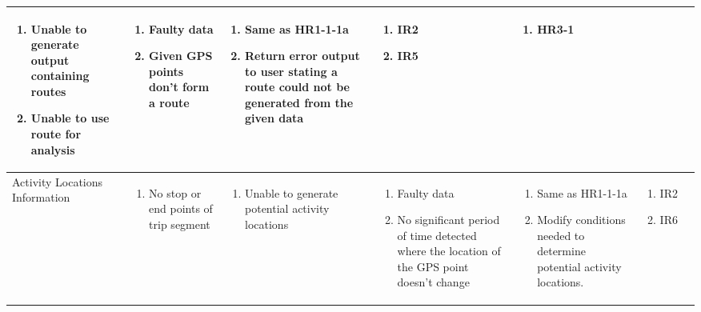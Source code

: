 \documentclass{article}
\begin{document}
\begin{landscape}
\begin{longtable}{|p{4cm}|p{2.5cm}|p{3.5cm}|p{3cm}|p{5.5cm}|p{1.8cm}|p{2cm}|}
\begin{enumerate}[label=1\alph*.]
     \item Unable to generate output containing routes
     \item Unable to use route for analysis
 \end{enumerate}
 & 
\begin{enumerate}[label=1\alph*.]
     \item Faulty data
     \item Given GPS points don't form a route
\end{enumerate}
 & 
\begin{enumerate}[label=1\alph*.]
      \item Same as HR1-1-1a
      \item Return error output to user stating a route could not be generated from the given data
\end{enumerate}
& 
\begin{enumerate}[label=1\alph*.]
    \item IR2
    \item IR5
\end{enumerate}
&
 \begin{enumerate}
     \item HR3-1
 \end{enumerate}
\\
\hline
Activity Locations Information
& 
\begin{enumerate}
    \item No stop or end points of trip segment
\end{enumerate}
& 
\begin{enumerate}
    \item Unable to generate potential activity locations
\end{enumerate}
& 
\begin{enumerate}[label=1\alph*.]
    \item Faulty data
    \item No significant period of time detected where the location of the GPS point doesn't change
\end{enumerate}
&
\begin{enumerate}[label=1\alph*.]
    \item Same as HR1-1-1a
    \item Modify conditions needed to determine potential activity locations.
\end{enumerate}
& 
\begin{enumerate}[label=1\alph*.]
    \item IR2
    \item IR6

\end{enumerate}
\end{longtable}
\end{landscape}
\end{document}
